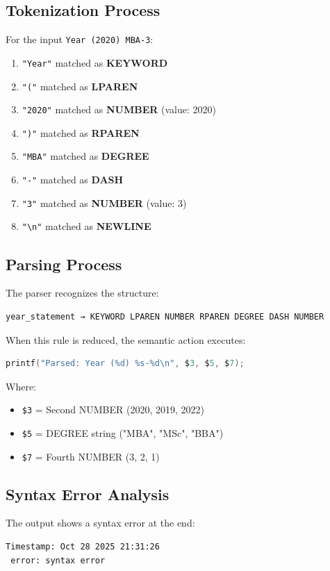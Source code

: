 \documentclass[12pt,a4paper]{article}
\begin{document}
\subsection{Tokenization Process}
For the input \texttt{Year (2020) MBA-3}:
\begin{enumerate}
    \item \texttt{"Year"} matched as \textbf{KEYWORD}
    \item \texttt{"("} matched as \textbf{LPAREN}
    \item \texttt{"2020"} matched as \textbf{NUMBER} (value: 2020)
    \item \texttt{")"} matched as \textbf{RPAREN}
    \item \texttt{"MBA"} matched as \textbf{DEGREE}
    \item \texttt{"-"} matched as \textbf{DASH}
    \item \texttt{"3"} matched as \textbf{NUMBER} (value: 3)
    \item \texttt{"\textbackslash n"} matched as \textbf{NEWLINE}
\end{enumerate}

\subsection{Parsing Process}
The parser recognizes the structure:
\begin{verbatim}
year_statement → KEYWORD LPAREN NUMBER RPAREN DEGREE DASH NUMBER
\end{verbatim}

When this rule is reduced, the semantic action executes:
\begin{lstlisting}[language=C]
printf("Parsed: Year (%d) %s-%d\n", $3, $5, $7);
\end{lstlisting}

Where:
\begin{itemize}
    \item \texttt{\$3} = Second NUMBER (2020, 2019, 2022)
    \item \texttt{\$5} = DEGREE string ("MBA", "MSc", "BBA")
    \item \texttt{\$7} = Fourth NUMBER (3, 2, 1)
\end{itemize}

\subsection{Syntax Error Analysis}
The output shows a syntax error at the end:
\begin{verbatim}
Timestamp: Oct 28 2025 21:31:26
 error: syntax error
\end{verbatim}
\end{document}
